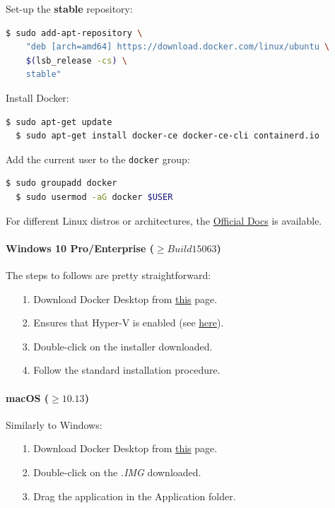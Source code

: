 \noindent Set-up the \textbf{stable} repository:
\begin{lstlisting}[language=bash, showstringspaces=false, basicstyle=\ttfamily]
  $ sudo add-apt-repository \
    "deb [arch=amd64] https://download.docker.com/linux/ubuntu \
    $(lsb_release -cs) \
    stable"
\end{lstlisting}

\noindent Install Docker:
\begin{lstlisting}[language=bash]
  $ sudo apt-get update
  $ sudo apt-get install docker-ce docker-ce-cli containerd.io
\end{lstlisting}

\noindent Add the current user to the \texttt{docker} group:
\begin{lstlisting}[language=bash]
  $ sudo groupadd docker
  $ sudo usermod -aG docker $USER
\end{lstlisting}

\noindent For different Linux distros or architectures, the \href{https://docs.docker.com/engine/install/}{Official Docs} is available.

\paragraph{Windows 10 Pro/Enterprise ($\geq Build 15063$)} The steps to follows are pretty straightforward:

\begin{itemize}
    \item[1.] Download Docker Desktop from \href{https://hub.docker.com/editions/community/docker-ce-desktop-windows/}{this} page.
    \item[2.] Ensures that Hyper-V is enabled (see \href{https://docs.microsoft.com/en-us/virtualization/hyper-v-on-windows/quick-start/enable-hyper-v}{here}).
    \item[3.] Double-click on the installer downloaded.
    \item[4.] Follow the standard installation procedure.
\end{itemize}

\paragraph{macOS ($\geq 10.13$)} Similarly to Windows:

\begin{itemize}
    \item[1.] Download Docker Desktop from \href{https://hub.docker.com/editions/community/docker-ce-desktop-mac/}{this} page.
    \item[2.] Double-click on the \textit{.IMG} downloaded.
    \item[3.] Drag the application in the Application folder.
\end{itemize}

